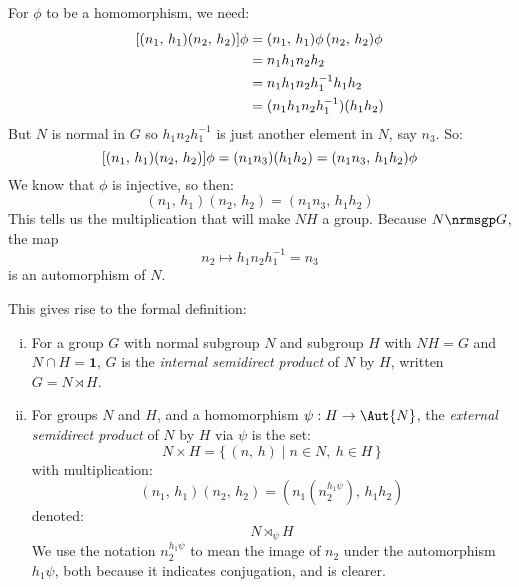For \(\phi\) to be a homomorphism, we need:
\begin{equation*}
\begin{aligned}
    \relax[(n_1,\,h_1)(n_2,\,h_2)]\phi &= (n_1,\,h_1)\phi\,(n_2,\,h_2)\phi \\
    &= n_1 h_1 n_2 h_2 \\
    &= n_1 h_1 n_2 h_1^{-1} h_1 h_2 \\
    &= (n_1 h_1 n_2 h_1^{-1})(h_1 h_2)
\end{aligned}
\end{equation*}
But \(N\) is normal in \(G\) so \(h_1 n_2 h_1^{-1}\) is just another element in \(N\), say \(n_3\).
So:
\[\relax[(n_1,\,h_1)(n_2,\,h_2)]\phi = (n_1 n_3)(h_1 h_2) = (n_1 n_3,\,h_1 h_2)\phi\]
We know that \(\phi\) is injective, so then:
\[(n_1,\,h_1)(n_2,\,h_2) = (n_1 n_3,\,h_1 h_2) \tag{\(\dagger\)}\]
This tells us the multiplication that will make \(NH\) a group.
Because \(N \nrmsgp G\), the map
\[n_2 \mapsto h_1 n_2 h_1^{-1} = n_3\]
is an automorphism of \(N\).

This gives rise to the formal definition:

\begin{definition}
\raggedright
\mbox{}
\begin{enumerate}[(i)]
    \item

        For a group \(G\) with normal subgroup \(N\) and subgroup \(H\) with \(NH = G\) and \(N \cap H = \bm{1}\),
        \(G\) is the \emph{internal semidirect product} of \(N\) by \(H\), written \(G = N \rtimes H\).
    \item

        For groups \(N\) and \(H\), and a homomorphism \(\psi:H \to \Aut{N}\), the \emph{external semidirect product} of
        \(N\) by \(H\) via \(\psi\) is the set:
        \[N \times H = \{\,(n,\,h) \mid n \in N,\ h \in H\,\}\]
        with multiplication:
        \[(n_1,\,h_1)(n_2,\,h_2) = (n_1(n_2^{h_1\psi}),\,h_1 h_2)\]
        denoted:
        \[N \rtimes_{\psi} H\]
        We use the notation \(n_2^{h_1\psi}\) to mean the image of \(n_2\) under the automorphism \(h_1\psi\), both
        because it indicates conjugation, and is clearer.
\end{enumerate}
\end{definition}

